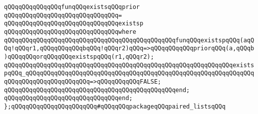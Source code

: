 \newline
\verb|qQQqqQQqqQQqqQQqfunqQQqexistsqQQqprior|\newline
\verb|qQQqqQQqqQQqqQQqqQQqqQQqqQQqqQQq=|\newline
\verb|qQQqqQQqqQQqqQQqqQQqqQQqqQQqqQQqexistsp|\newline
\verb|qQQqqQQqqQQqqQQqqQQqqQQqqQQqqQQqwhere|\newline
\verb|qQQqqQQqqQQqqQQqqQQqqQQqqQQqqQQqqQQqqQQqqQQqqQQqfunqQQqexistspqQQq(aqQQq!qQQqr1,qQQqqQQqqQQqbqQQq!qQQqr2)qQQq=>qQQqqQQqqQQqpriorqQQq(a,qQQqb)qQQqqQQqorqQQqqQQqexistspqQQq(r1,qQQqr2);|\newline
\verb|qQQqqQQqqQQqqQQqqQQqqQQqqQQqqQQqqQQqqQQqqQQqqQQqqQQqqQQqqQQqqQQqexistspqQQq_qQQqqQQqqQQqqQQqqQQqqQQqqQQqqQQqqQQqqQQqqQQqqQQqqQQqqQQqqQQqqQQqqQQqqQQqqQQqqQQqqQQqqQQq=>qQQqqQQqqQQqFALSE;|\newline
\verb|qQQqqQQqqQQqqQQqqQQqqQQqqQQqqQQqqQQqqQQqqQQqqQQqend;|\newline
\verb|qQQqqQQqqQQqqQQqqQQqqQQqqQQqqQQqend;|\newline
\newline
\verb|};qQQqqQQqqQQqqQQqqQQqqQQq#qQQqqQQqpackageqQQqpaired_listsqQQq|\newline
\newline
\newline

